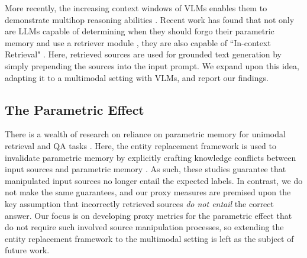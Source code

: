 More recently, the increasing context windows of VLMs enables them to demonstrate multihop reasoning abilities \citep{liu2024visual,abdin2024phi,wang2024qwen2}. Recent work has found that not only are LLMs capable of determining when they should forgo their parametric memory and use a retriever module \citep{labruna2024retrieve}, they are also capable of ``In-context Retrieval" \cite{incontext_rag}. Here, retrieved sources are used for grounded text generation by simply prepending the sources into the input prompt. We expand upon this idea, adapting it to a multimodal setting with VLMs, and report our findings.

\subsection{The Parametric Effect}
There is a wealth of research on reliance on parametric memory for unimodal retrieval and QA tasks \citep{galway_mitigation_2024,xu_knowledge_2024,longpre_entity-based_2022,neeman_disentqa_2022,hong_why_2024,chen_rich_2022}. Here, the entity replacement framework \citep{longpre_entity-based_2022,neeman_disentqa_2022} is used to invalidate parametric memory by explicitly crafting knowledge conflicts between input sources and parametric memory \citep{xu_knowledge_2024,hong_why_2024,chen_rich_2022}. As such, these studies guarantee that manipulated input sources no longer entail the expected labels.
In contrast, we do not make the same guarantees, and our proxy measures are premised upon the key assumption that incorrectly retrieved sources \textit{do not entail} the correct answer. Our focus is on developing proxy metrics for the parametric effect that do not require such involved source manipulation processes, so extending the entity replacement framework to the multimodal setting is left as the subject of future work.








